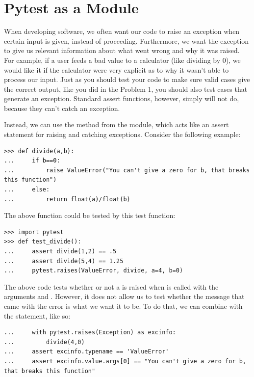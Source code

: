 \section*{Pytest as a Module} %

When developing software, we often want our code to raise an exception when certain input is given, instead of proceeding.  Furthermore, we want the exception to give us relevant information about what went wrong and why it was raised.
For example, if a user feeds a bad value to a calculator (like dividing by 0), we would like it if the calculator were very explicit as to why it wasn't able to process our input.
Just as you should test your code to make sure valid cases give the correct output, like you did in the Problem 1, you should also test cases that generate an exception.  Standard assert functions, however, simply will not do, because they can't catch an exception.

Instead, we can use the  method from the  module, which acts like an assert statement for raising and catching exceptions.
Consider the following example:

\begin{lstlisting}
>>> def divide(a,b):
...     if b==0:
...         raise ValueError("You can't give a zero for b, that breaks this function")
...     else:
...         return float(a)/float(b)
\end{lstlisting}

The above function could be tested by this test function:

\begin{lstlisting}
>>> import pytest
>>> def test_divide():
...     assert divide(1,2) == .5
...     assert divide(5,4) == 1.25
...     pytest.raises(ValueError, divide, a=4, b=0)

\end{lstlisting}

The above code tests whether or not a  is raised when  is called with the arguments  and .  However, it does not allow us to test whether the message that came with the error is what we want it to be.  To do that, we can combine  with the  statement, like so:

\begin{lstlisting}
...     with pytest.raises(Exception) as excinfo:
...         divide(4,0)
...     assert excinfo.typename == 'ValueError'
...     assert excinfo.value.args[0] == "You can't give a zero for b, that breaks this function"
\end{lstlisting}

